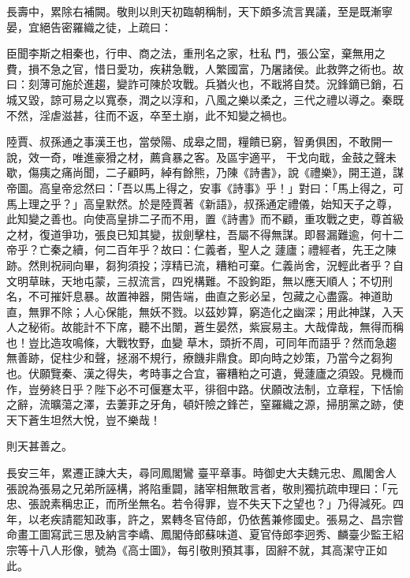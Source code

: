 \begin{pinyinscope}
 長壽中，累除右補闕。敬則以則天初臨朝稱制，天下頗多流言異議，至是既漸寧晏，宜絕告密羅織之徒，上疏曰：



 臣聞李斯之相秦也，行申、商之法，重刑名之家，杜私
 門，張公室，棄無用之費，損不急之官，惜日愛功，疾耕急戰，人繁國富，乃屠諸侯。此救弊之術也。故曰：刻薄可施於進趨，變詐可陳於攻戰。兵猶火也，不戢將自焚。況鋒鏑已銷，石城又毀，諒可易之以寬泰，潤之以淳和，八風之樂以柔之，三代之禮以導之。秦既不然，淫虐滋甚，往而不返，卒至土崩，此不知變之禍也。



 陸賈、叔孫通之事漢王也，當滎陽、成皋之間，糧饋已窮，智勇俱困，不敢開一說，效一奇，唯進豪猾之材，薦貪暴之客。及區宇適平，
 干戈向戢，金鼓之聲未歇，傷痍之痛尚聞，二子顧眄，綽有餘熊，乃陳《詩書》，說《禮樂》，開王道，謀帝圖。高皇帝忿然曰：「吾以馬上得之，安事《詩事》乎！」對曰：「馬上得之，可馬上理之乎？」高皇默然。於是陸賈著《新語》，叔孫通定禮儀，始知天子之尊，此知變之善也。向使高皇排二子而不用，置《詩書》而不顧，重攻戰之吏，尊首級之材，復道爭功，張良已知其變，拔劍擊柱，吾屬不得無謀。即晷漏難逾，何十二帝乎？亡秦之續，何二百年乎？故曰：仁義者，聖人之
 蘧廬；禮經者，先王之陳跡。然則祝祠向畢，芻狗須投；淳精已流，糟粕可棄。仁義尚舍，況輕此者乎？自文明草昧，天地屯蒙，三叔流言，四兇構難。不設鉤距，無以應天順人；不切刑名，不可摧奸息暴。故置神器，開告端，曲直之影必呈，包藏之心盡露。神道助直，無罪不除；人心保能，無妖不戮。以茲妙算，窮造化之幽深；用此神謀，入天人之秘術。故能計不下席，聽不出闈，蒼生晏然，紫宸易主。大哉偉哉，無得而稱也！豈比造攻鳴條，大戰牧野，血變
 草木，頭折不周，可同年而語乎？然而急趨無善跡，促柱少和聲，拯溺不規行，療饑非鼎食。即向時之妙策，乃當今之芻狗也。伏願覽秦、漢之得失，考時事之合宜，審糟粕之可遺，覺蘧廬之須毀。見機而作，豈勞終日乎？陛下必不可偃蹇太平，徘徊中路。伏願改法制，立章程，下恬愉之辭，流曠蕩之澤，去萋菲之牙角，頓奸險之鋒芒，窒羅織之源，掃朋黨之跡，使天下蒼生坦然大悅，豈不樂哉！



 則天甚善之。



 長安三年，累遷正諫大夫，尋同鳳閣鸞
 臺平章事。時御史大夫魏元忠、鳳閣舍人張說為張易之兄弟所誣構，將陷重闢，諸宰相無敢言者，敬則獨抗疏申理曰：「元忠、張說素稱忠正，而所坐無名。若令得罪，豈不失天下之望也？」乃得減死。四年，以老疾請罷知政事，許之，累轉冬官侍郎，仍依舊兼修國史。張易之、昌宗嘗命畫工圖寫武三思及納言李嶠、鳳閣侍郎蘇味道、夏官侍郎李迥秀、麟臺少監王紹宗等十八人形像，號為《高士圖》，每引敬則預其事，固辭不就，其高潔守正如
 此。




\end{pinyinscope}
